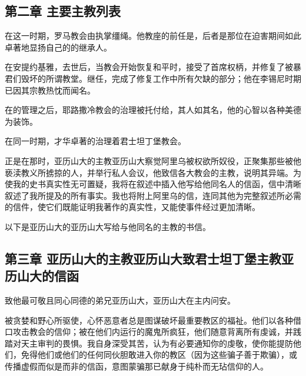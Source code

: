 
\subsection{第二章 主要主教列表}

在这一时期，罗马教会由执掌缰绳。他教座的前任是，后者是那位在迫害期间如此卓著地显扬自己的的继承人。\par

在安提约基雅，去世后，当教会开始恢复和平时，接受了首席权柄，并修复了被暴君们毁坏的所谓教堂。继任，完成了修复工作中所有欠缺的部分；他在李锡尼时期已因其宗教热忱而闻名。\par

在的管理之后，耶路撒冷教会的治理被托付给，其人如其名，他的心智以各种美德为装饰。\par

在同一时期，才华卓著的治理着君士坦丁堡教会。\par

正是在那时，亚历山大的主教亚历山大察觉阿里乌被权欲所奴役，正聚集那些被他亵渎教义所掳掠的人，并举行私人会议，他致信各大教会的主教，说明其异端。为使我的史书真实性无可置疑，我将在叙述中插入他写给他同名人的信函，信中清晰叙述了我所提及的所有事实。我也将附上阿里乌的信，连同其他为完整叙述所必需的信件，使它们既能证明我著作的真实性，又能使事件经过更加清晰。\par

以下是亚历山大的亚历山大写给与他同名的主教的书信。\par


\subsection{第三章 亚历山大的主教亚历山大致君士坦丁堡主教亚历山大的信函}

致他最可敬且同心同德的弟兄亚历山大，亚历山大在主内问安。\par

被贪婪和野心所驱使，心怀恶意者总是图谋破坏最重要教区的福祉。他们以各种借口攻击教会的信仰；被在他们内运行的魔鬼所疯狂，他们随意背离所有虔诚，并践踏对天主审判的畏惧。我自身深受其苦，认为有必要通知你的虔敬，使你能提防他们，免得他们或他们的任何同伙胆敢进入你的教区（因为这些骗子善于欺骗），或传播虚假而似是而非的信函，意图蒙骗那已献身于纯朴而无玷信仰的人。\par

